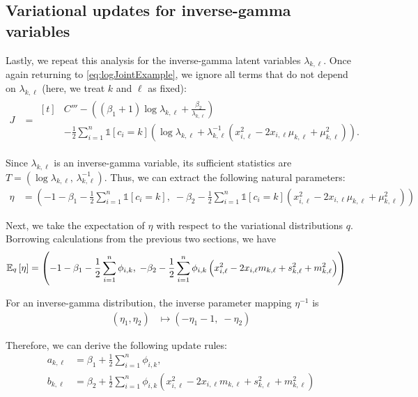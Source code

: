 \documentclass[11pt]{article}
\begin{document}
\subsection{Variational updates for inverse-gamma variables}

Lastly, we repeat this analysis for the inverse-gamma latent variables $\lambda_{k,\ell}$.
Once again returning to \eqref{eq:logJointExample}, we ignore all terms that do not depend on $\lambda_{k,\ell}$ (here, we treat $k$ and $\ell$ as fixed):
\begin{align}
J
&= \begin{aligned}[t]
    & C''' - \left((\beta_1 + 1) \log \lambda_{k,\ell} + \frac{\beta_2}{\lambda_{k,\ell}} \right) \\
    & - \frac{1}{2} \sum_{i=1}^n \mathds{1}[c_i = k]
        \left( \log \lambda_{k,\ell} + \lambda_{k,\ell}^{-1} \left( x_{i,\ell}^2 - 2 x_{i,\ell} \mu_{k,\ell} + \mu_{k,\ell}^2 \right) \right).
    \end{aligned}
\end{align}

Since $\lambda_{k,\ell}$ is an inverse-gamma variable, its sufficient statistics are $T = (\log \lambda_{k,\ell}, \, \lambda_{k,\ell}^{-1})$.
Thus, we can extract the following natural parameters:
\begin{align}
\eta
&=
\left(
    -1 - \beta_1 - \frac{1}{2} \sum_{i=1}^n \mathds{1}[c_i=k], \;
    -\beta_2 - \frac{1}{2} \sum_{i=1}^n \mathds{1}[c_i=k] \left( x_{i,\ell}^2 - 2 x_{i,\ell} \mu_{k,\ell} + \mu_{k,\ell}^2 \right)
\right)
\end{align}

Next, we take the expectation of $\eta$ with respect to the variational distributions $q$.
Borrowing calculations from the previous two sections, we have
\begin{align}
\mathbb{E}_{\substack{q}}\left[ \eta \right]
&=
\left(
    -1 - \beta_1 - \frac{1}{2} \sum_{i=1}^n \phi_{i,k}, \;
    -\beta_2 - \frac{1}{2} \sum_{i=1}^n \phi_{i,k}
        \left( x_{i,\ell}^2 - 2 x_{i,\ell} m_{k,\ell} + s_{k,\ell}^2 + m_{k,\ell}^2 \right)
\right)
\end{align}

For an inverse-gamma distribution, the inverse parameter mapping $\eta^{-1}$ is
\begin{align}
(\eta_1, \eta_2)
&\mapsto
\left(
    -\eta_1 - 1, \;
    -\eta_2
\right)
\end{align}

Therefore, we can derive the following update rules:
\begin{align}
\label{eq:exVarUpdateA}
a_{k,\ell}
&= \beta_1 + \frac{1}{2} \sum_{i=1}^n \phi_{i,k}, \\
\label{eq:exVarUpdateB}
b_{k,\ell}
&= \beta_2 + \frac{1}{2} \sum_{i=1}^n \phi_{i,k}
    \left( x_{i,\ell}^2 - 2 x_{i,\ell} m_{k,\ell} + s_{k,\ell}^2 + m_{k,\ell}^2 \right)
\end{align}
\end{document}
